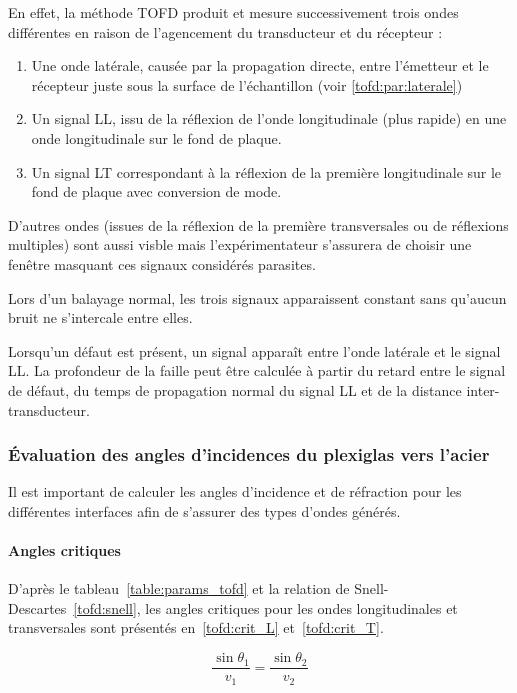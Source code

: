 En effet, la méthode TOFD produit et mesure successivement trois ondes différentes en raison de l'agencement du transducteur et du récepteur :

\begin{enumerate}
    \item Une onde latérale, causée par la propagation directe, entre l'émetteur et le
			récepteur juste sous la surface de l'échantillon (voir \ref{tofd:par:laterale})
    \item Un signal LL, issu de la réflexion de l'onde longitudinale (plus rapide) en une onde longitudinale sur le fond de plaque.
    \item Un signal LT correspondant à la réflexion de la première longitudinale sur le fond de plaque avec conversion de mode.
\end{enumerate}

D'autres ondes (issues de la réflexion de la première transversales ou de réflexions
multiples) sont aussi visble mais l'expérimentateur s'assurera de choisir une fenêtre
masquant ces signaux considérés parasites.

Lors d'un balayage normal, les trois signaux apparaissent constant sans qu'aucun bruit ne
s'intercale entre elles.

Lorsqu'un défaut est présent, un signal apparaît entre l'onde latérale et le signal LL.
La profondeur de la faille peut être calculée à partir du retard entre le signal de défaut, du temps de propagation normal du signal LL et de la distance inter-transducteur.

\subsubsection{Évaluation des angles d'incidences du plexiglas vers l'acier}
\label{tofd:par:inc_plexi_acier}

Il est important de calculer les angles d'incidence et de réfraction pour les différentes interfaces afin de s'assurer des types d'ondes générés.

\paragraph{Angles critiques} D'après le tableau~\ref{table:params_tofd} et la relation de Snell-Descartes~\eqref{tofd:snell},
les angles critiques pour les ondes longitudinales et transversales sont présentés en~\eqref{tofd:crit_L} et~\eqref{tofd:crit_T}.

\begin{equation}
    \frac{\sin\theta_1}{v_1} = \frac{\sin\theta_2}{v_2}
\label{tofd:snell}
\end{equation}

